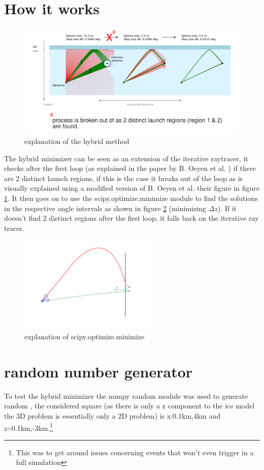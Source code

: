 \documentclass[twoside,twocolumn,11pt]{article} %
\begin{document}
\section{How it works}
\begin{figure}
	\centering
	\includegraphics[width=\textwidth]{figures/explanation.png}
	\caption{explanation of the hybrid method}
	\label{fig:explanation}
\end{figure}
The hybrid minimizer can be seen as an extension of the iterative raytracer, it
checks after the first loop (as explained in the paper by B. Oeyen et al.
\cite{2022icrc.confE1027O}) if there are 2 distinct launch regions, if this is
the case it breaks out of the loop 
as is visually explained using a modified version of B. Oeyen et al. their figure in
figure \ref{fig:explanation}. 
It then goes on to use the scipy.optimize.minimize module
to find the solutions in the respective angle intervals
as shown in figure \ref{fig:explscipy} (minimizing $\Delta z$). If it doesn't find 2
distinct regions after the first loop, it falls back on the iterative ray tracer. 
\begin{figure}
	\centering
	\includegraphics[width=0.6\textwidth]{figures/PrincipleHybridIllu.pdf}
	\caption{explanation of scipy.optimize.minimize}
	\label{fig:explscipy}
\end{figure}
\section{random number generator}
To test the hybrid minimizer the numpy random module was used to generate
random , the considered square (as there is only a z component to the
ice model the 3D problem is essentially only a 2D problem) is x:0.1km,4km and
z:-0.1km,-3km.\footnote{This was to get around issues concerning events that 
won't even trigger in a full simulation}
\end{document}

